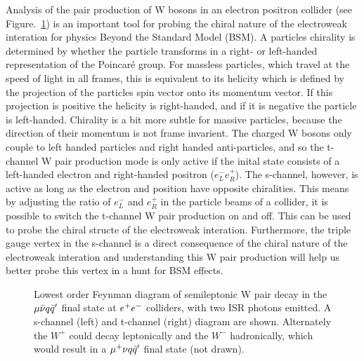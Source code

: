 Analysis of the pair production of W bosons in an electron positron collider (see Figure.~\ref{FEY:SemileptonicDecays}) is an important tool for probing the chiral nature of the electroweak interation for physics Beyond the Standard Model (BSM). A particles chirality is determined by whether the particle transforms in a right- or left-handed representation of the Poincaré group. For massless particles, which travel at the speed of light in all frames, this is equivalent to its helicity which is defined by the projection of the particles spin vector onto its momentum vector. If this projection is positive the helicity is right-handed, and if it is negative the particle is left-handed. Chirality is a bit more subtle for massive particles, because the direction of their momentum is not frame invarient. The charged W bosons only couple to left handed particles and right handed anti-particles, and so the t-channel W pair production mode is only active if the inital state consists of a left-handed electron and right-handed positron (${e}_{L}^{-}{e}_{R}^{+}$). The s-channel, however, is active as long as the electron and position have opposite chiralities. This means by adjusting the ratio of ${e}_{L}^{-}$ and ${e}_{R}^{+}$ in the particle beams of a collider, it is possible to switch the t-channel W pair production on and off. This can be used to probe the chiral structe of the electroweak interation. Furthermore, the triple gauge vertex in the s-channel is a direct consequence of the chiral nature of the electroweak interation and understanding this W pair production will help us better probe this vertex in a hunt for BSM effects.
\\
\begin{figure}
  \centering
  
  
  \caption{Lowest order Feynman diagram of semileptonic W pair decay in the $\mu\bar{\nu} q\bar{q}'$ final state at $e^{+}e^{-}$ colliders, with two ISR photons emitted. A s-channel (left) and t-channel (right) diagram are shown. Alternately the ${W}^{+}$ could decay leptonically and the ${W}^{-}$ hadronically, which would result in a $\mu^{+}\nu q\bar{q}'$ final state (not drawn).}
  \label{FEY:SemileptonicDecays}
\end{figure}

